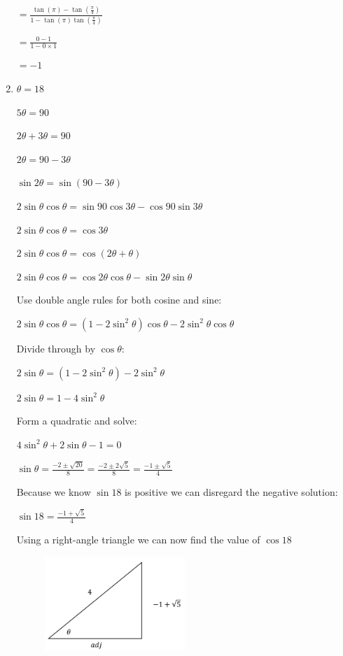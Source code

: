 \documentclass[../main.tex]{subfiles}
\begin{document}
\begin{enumerate}[itemsep=0.4cm]
    $=\frac{\tan{(\pi)}-\tan{(\frac{\pi}{4})}}{1-\tan{(\pi)}\tan{(\frac{\pi}{4})}}$

    $=\frac{0-1}{1-0\times 1}$

    $=-1$

    \item 
    $\theta = 18$

    $5\theta = 90$

    $2\theta +3\theta = 90$

    $2\theta = 90 - 3\theta$

    $\sin{2\theta}=\sin{(90 - 3\theta)}$

    $2\sin{\theta}\cos{\theta}=\sin{90}\cos{3\theta}-\cos{90}\sin{3\theta}$

    $2\sin{\theta}\cos{\theta}=\cos{3\theta}$

    $2\sin{\theta}\cos{\theta}=\cos{(2\theta + \theta)}$

    $2\sin{\theta}\cos{\theta}=\cos{2\theta}\cos{\theta}-\sin{2\theta}\sin{\theta}$

    Use double angle rules for both cosine and sine:

    $2\sin{\theta}\cos{\theta}=(1-2\sin^2{\theta})\cos{\theta}-2\sin^2{\theta}\cos{\theta}$

    Divide through by $\cos{\theta}$:

    $2\sin{\theta}=(1-2\sin^2{\theta})-2\sin^2{\theta}$

    $2\sin{\theta}=1-4\sin^2{\theta}$

    Form a quadratic and solve:

    $4\sin^2{\theta}+2\sin{\theta}-1=0$

    $\sin{\theta}=\frac{-2\pm \sqrt{20}}{8}=\frac{-2\pm 2\sqrt{5}}{8}=\frac{-1\pm \sqrt{5}}{4}$

    Because we know $\sin{18}$ is positive we can disregard the negative solution:

    $\sin{18}=\frac{-1+\sqrt{5}}{4}$

    Using a right-angle triangle we can now find the value of $\cos{18}$

    \begin{figure}[h]
        \centering
        \includegraphics[width=0.5\textwidth]{images/exacttrigvalues11.png}
    \end{figure}


\end{enumerate}
\end{document}
